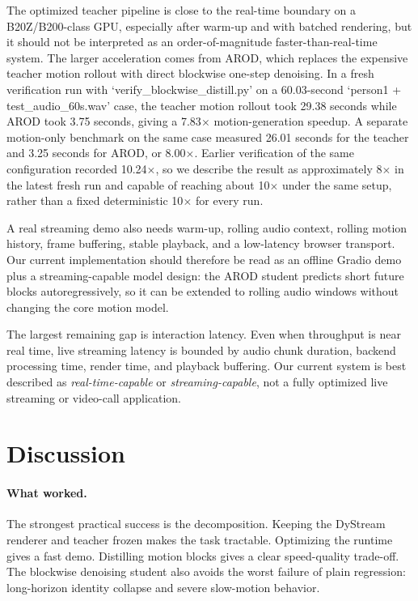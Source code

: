 \documentclass{article}
\begin{document}
The optimized teacher pipeline is close to the real-time boundary on a B20Z/B200-class GPU, especially after warm-up and with batched rendering, but it should not be interpreted as an order-of-magnitude faster-than-real-time system. The larger acceleration comes from AROD, which replaces the expensive teacher motion rollout with direct blockwise one-step denoising. In a fresh verification run with `verify\_blockwise\_distill.py' on a 60.03-second `person1 + test\_audio\_60s.wav' case, the teacher motion rollout took 29.38 seconds while AROD took 3.75 seconds, giving a 7.83$\times$ motion-generation speedup. A separate motion-only benchmark on the same case measured 26.01 seconds for the teacher and 3.25 seconds for AROD, or 8.00$\times$. Earlier verification of the same configuration recorded 10.24$\times$, so we describe the result as approximately 8$\times$ in the latest fresh run and capable of reaching about 10$\times$ under the same setup, rather than a fixed deterministic 10$\times$ for every run.

A real streaming demo also needs warm-up, rolling audio context, rolling motion history, frame buffering, stable playback, and a low-latency browser transport. Our current implementation should therefore be read as an offline Gradio demo plus a streaming-capable model design: the AROD student predicts short future blocks autoregressively, so it can be extended to rolling audio windows without changing the core motion model.

The largest remaining gap is interaction latency. Even when throughput is near real time, live streaming latency is bounded by audio chunk duration, backend processing time, render time, and playback buffering. Our current system is best described as \textit{real-time-capable} or \textit{streaming-capable}, not a fully optimized live streaming or video-call application.

\section{Discussion}

\paragraph{What worked.}
The strongest practical success is the decomposition. Keeping the DyStream renderer and teacher frozen makes the task tractable. Optimizing the runtime gives a fast demo. Distilling motion blocks gives a clear speed-quality trade-off. The blockwise denoising student also avoids the worst failure of plain regression: long-horizon identity collapse and severe slow-motion behavior.
\end{document}

